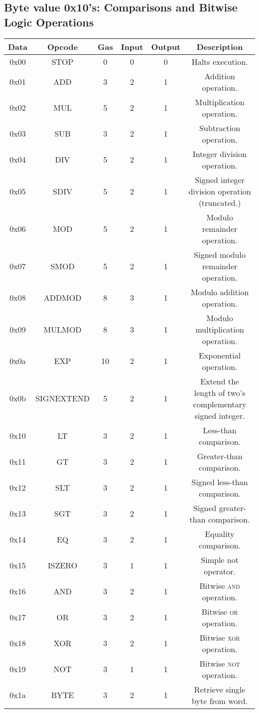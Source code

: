 \documentclass[10pt,a4paper,leqno,bibliography=totoc]{scrartcl}
\newenvironment{alphafootnotes}
{\par\edef\savedfootnotenumber{\number\value{footnote}}
\renewcommand{\thefootnote}{\alph{footnote}}
\setcounter{footnote}{0}}
{\par\setcounter{footnote}{\savedfootnotenumber}}
\begin{document}
\begin{alphafootnotes}
	\subsection{Byte value 0x10's: Comparisons and Bitwise Logic Operations}
\begin{longtable}{|cccccc|}
\hline
	\textbf{Data} & \textbf{Opcode} & \textbf{Gas} & \textbf{Input} & \textbf{Output} & \textbf{Description} \\
\hline
	0x00 & STOP & 0 & 0 & 0 & Halts execution. \\
	0x01 & ADD & 3 & 2 & 1 & Addition operation. \\
	0x02 & MUL & 5 & 2 & 1 & Multiplication operation. \\
	0x03 & SUB & 3 & 2 & 1 & Subtraction operation. \\
	0x04 & DIV & 5 & 2 & 1 & Integer division operation. \\
	0x05 & SDIV & 5 & 2 & 1 & Signed integer division operation (truncated.)\\
	0x06 & MOD & 5 & 2 & 1 & Modulo remainder operation. \\
	0x07 & SMOD & 5 & 2 & 1 & Signed modulo remainder operation. \\
	0x08 & ADDMOD & 8 & 3 & 1 & Modulo addition operation. \\
	0x09 & MULMOD & 8 & 3 & 1 & Modulo multiplication operation. \\
	0x0a & EXP & 10 & 2 & 1 & Exponential operation. \\
	0x0b & SIGNEXTEND & 5  & 2 & 1 & Extend the length of two's complementary signed integer. \\
	0x10 & LT & 3 & 2 & 1 & Less-than comparison. \\
	0x11 & GT & 3 & 2 & 1 & Greater-than comparison. \\
	0x12 & SLT & 3 & 2 & 1 & Signed less-than comparison. \\
	0x13 & SGT & 3 & 2 & 1 & Signed greater-than comparison. \\
	0x14 & EQ & 3 & 2 & 1 & Equality comparison. \\
	0x15 & ISZERO & 3 & 1 & 1 & Simple not operator. \\
	0x16 & AND & 3 & 2 & 1 & Bitwise \textsc{and} operation. \\
	0x17 & OR & 3 & 2 & 1 & Bitwise \textsc{or} operation. \\
	0x18 & XOR & 3 & 2 & 1 & Bitwise \textsc{xor} operation. \\
	0x19 & NOT & 3 & 1 & 1 & Bitwise \textsc{not} operation. \\
	0x1a & BYTE & 3 & 2 & 1 & Retrieve single byte from word. \\
\hline
\end{longtable}


\end{alphafootnotes}
\end{document}
